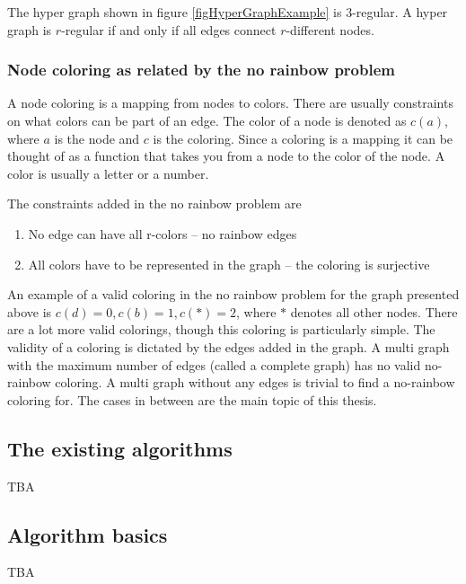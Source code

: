 
The hyper graph shown in figure \ref{figHyperGraphExample} is $3$-regular.
A hyper graph is $r$-regular if and only if all edges connect $r$-different nodes.
\cite{sourceHyper}

\subsubsection{Node coloring as related by the no rainbow problem}
A node coloring is a mapping from nodes to colors.
There are usually constraints on what colors can be part of an edge.
The color of a node is denoted as $c(a)$, where $a$ is the node and $c$ is the coloring.
Since a coloring is a mapping it can be thought of as a function that takes you from a node to the color of the node.
A color is usually a letter or a number.

The constraints added in the no rainbow problem are
\begin{enumerate}
  \item No edge can have all r-colors -- no rainbow edges
  \item All colors have to be represented in the graph -- the coloring is surjective
\end{enumerate}

An example of a valid coloring in the no rainbow problem for the graph presented above is $c(d)=0, c(b)=1, c(*)=2$, where $*$ denotes all other nodes.
There are a lot more valid colorings, though this coloring is particularly simple.
The validity of a coloring is dictated by the edges added in the graph.
A multi graph with the maximum number of edges (called a complete graph) has no valid no-rainbow coloring.
A multi graph without any edges is trivial to find a no-rainbow coloring for.
The cases in between are the main topic of this thesis.

\cite{sourceHyper}

\subsection{The existing algorithms}
TBA

\subsection{Algorithm basics}
TBA

